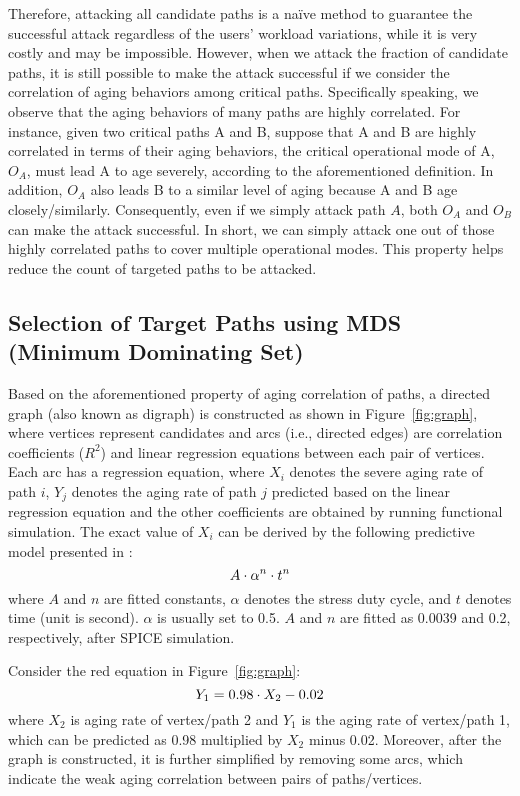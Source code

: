 Therefore, attacking all candidate paths is a na\"ive method to guarantee the successful attack regardless of the users' workload variations, while it is very costly and may be impossible. 
However, when we attack the fraction of candidate paths, it is still possible to make the attack successful if we consider the correlation of aging behaviors among critical paths. Specifically speaking, we observe that the aging behaviors of many paths are highly correlated. For instance, given two critical paths A and B, suppose that A and B are highly correlated in terms of their aging behaviors, the critical operational mode of A, $O_{A}$, must lead A to age severely, according to the aforementioned definition. In addition, $O_{A}$ also leads B to a similar level of aging because A and B age closely/similarly. Consequently, even if we simply attack path $A$, both $O_{A}$ and  $O_{B}$ can make the attack successful. In short, we can simply attack one out of those highly correlated paths to cover multiple operational modes. This property helps reduce the count of targeted paths to be attacked.%

\subsection{Selection of Target Paths using MDS (Minimum Dominating Set)}
\label{sec:frame:mds}
Based on the aforementioned property of aging correlation of paths, a directed graph (also known as digraph) is constructed as shown in Figure~\ref{fig:graph}, where vertices represent candidates and arcs (i.e., directed edges) are correlation coefficients ($R^2$) and linear regression equations between each pair of vertices. Each arc has a regression equation, where $X_{i}$ denotes the severe aging rate of path $i$, $Y_{j}$ denotes the aging rate of path $j$ predicted based on the linear regression equation and the other coefficients are obtained by running functional simulation. The exact value of $X_{i}$ can be derived by the following predictive model presented in \cite{wang2007efficient}:
\begin{equation}
	\fontsize{8}{8} \selectfont
	A \cdot \alpha^n \cdot t^n 
	\label{eq:worst}
\end{equation}
where $A$ and $n$ are fitted constants, $\alpha$ denotes the stress duty cycle, and $t$ denotes time (unit is second). $\alpha$ is usually set to 0.5. $A$ and $n$ are fitted as 0.0039 and 0.2, respectively, after SPICE simulation.

Consider the red equation in Figure~\ref{fig:graph}:
\begin{equation}
	\centering
	\fontsize{8}{8} \selectfont
	Y_{1} = 0.98 \cdot X_{2} - 0.02
\end{equation}
where $X_{2}$ is aging rate of vertex/path 2 and $Y_{1}$ is the aging rate of vertex/path 1, which can be predicted as 0.98 multiplied by $X_{2}$ minus 0.02.
Moreover, after the graph is constructed, it is further simplified by removing some arcs, which indicate the weak aging correlation between pairs of paths/vertices.

